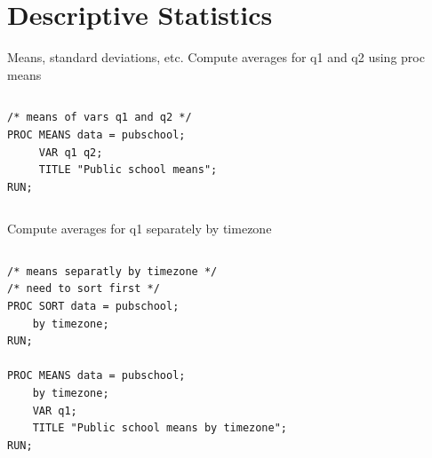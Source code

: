 \documentclass[table,smaller]{beamer}
\begin{document}
\section{Descriptive Statistics}
\label{sec-3}

\begin{frame}[fragile,label=sec-3-1]{Means, standard deviations, etc.}
 Compute averages for q1 and q2 using proc means
\vspace{-.75em} \begin{columns}  \begin{block}{}

\begin{verbatim}
/* means of vars q1 and q2 */
PROC MEANS data = pubschool;
     VAR q1 q2;
     TITLE "Public school means";
RUN;
\end{verbatim}

\end{block} \end{columns} \vspace{.25em}

Compute averages for q1 separately by timezone
\vspace{-.75em} \begin{columns}  \begin{block}{}

\begin{verbatim}
/* means separatly by timezone */
/* need to sort first */
PROC SORT data = pubschool;
    by timezone;
RUN;

PROC MEANS data = pubschool;
    by timezone;
    VAR q1;
    TITLE "Public school means by timezone";
RUN;
\end{verbatim}

\end{block} \end{columns} \vspace{.25em}
\end{frame}
\end{document}
